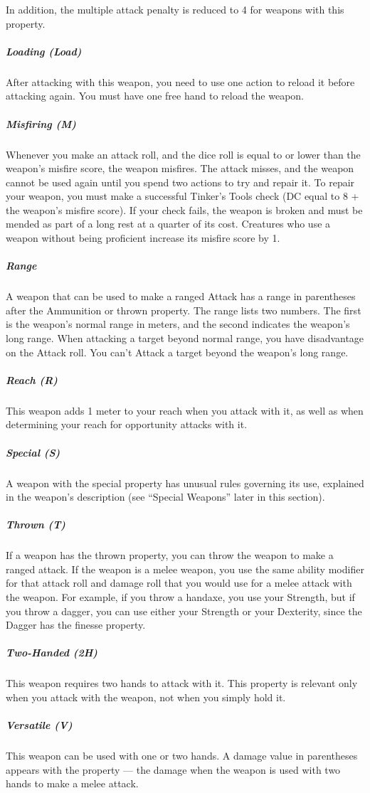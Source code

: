         In addition, the multiple attack penalty is reduced to 4 for weapons with this property.
    \subparagraph{Loading (Load)}
        After attacking with this weapon, you need to use one action to reload it before attacking again.
        You must have one free hand to reload the weapon.
    \subparagraph{Misfiring (M)}
        Whenever you make an attack roll, and the dice roll is equal to or lower than the weapon's misfire score, the weapon misfires.
        The attack misses, and the weapon cannot be used again until you spend two actions to try and repair it.
        To repair your weapon, you must make a successful Tinker's Tools check (DC equal to 8 + the weapon's misfire score).
        If your check fails, the weapon is broken and must be mended as part of a long rest at a quarter of its cost.
        Creatures who use a weapon without being proficient increase its misfire score by 1.
    \subparagraph{Range}
        A weapon that can be used to make a ranged Attack has a range in parentheses after the Ammunition or thrown property.
        The range lists two numbers.
        The first is the weapon's normal range in meters, and the second indicates the weapon's long range.
        When attacking a target beyond normal range, you have disadvantage on the Attack roll.
        You can't Attack a target beyond the weapon's long range.
    \subparagraph{Reach (R)}
        This weapon adds 1 meter to your reach when you attack with it, as well as when determining your reach for opportunity attacks with it.
    \subparagraph{Special (S)}
        A weapon with the special property has unusual rules governing its use, explained in the weapon's description (see ``Special Weapons'' later in this section).
    \subparagraph{Thrown (T)}
        If a weapon has the thrown property, you can throw the weapon to make a ranged attack.
        If the weapon is a melee weapon, you use the same ability modifier for that attack roll and damage roll that you would use for a melee attack with the weapon.
        For example, if you throw a handaxe, you use your Strength, but if you throw a dagger, you can use either your Strength or your Dexterity, since the Dagger has the finesse property.
    \subparagraph{Two-Handed (2H)}
        This weapon requires two hands to attack with it.
        This property is relevant only when you attack with the weapon, not when you simply hold it.
    \subparagraph{Versatile (V)}
        This weapon can be used with one or two hands.
        A damage value in parentheses appears with the property --- the damage when the weapon is used with two hands to make a melee attack.
